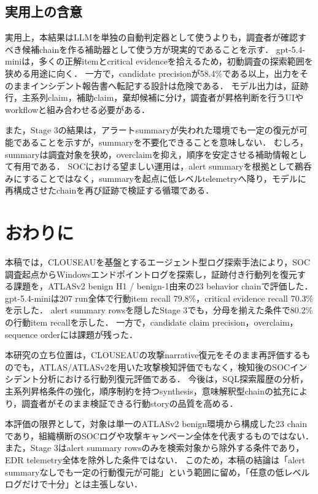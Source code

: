 \documentclass[dvipdfmx]{FITpaper}
\newcommand{\model}[1]{\mbox{\textrm{#1}}}
\begin{document}
\subsection{実用上の含意}

実用上，本結果はLLMを単独の自動判定器として使うよりも，調査者が確認すべき候補chainを作る補助器として使う方が現実的であることを示す．
\model{gpt-5.4-mini}は，多くの正解itemとcritical evidenceを拾えるため，初動調査の探索範囲を狭める用途に向く．
一方で，candidate precisionが58.4\%である以上，出力をそのままインシデント報告書へ転記する設計は危険である．
モデル出力は，証跡行，主系列claim，補助claim，棄却候補に分け，調査者が昇格判断を行うUIやworkflowと組み合わせる必要がある．

また，Stage 3の結果は，アラートsummaryが失われた環境でも一定の復元が可能であることを示すが，summaryを不要化できることを意味しない．
むしろ，summaryは調査対象を狭め，overclaimを抑え，順序を安定させる補助情報として有用である．
SOCにおける望ましい運用は，alert summaryを根拠として鵜呑みにすることではなく，summaryを起点に低レベルtelemetryへ降り，モデルに再構成させたchainを再び証跡で検証する循環である．



\section{おわりに}

本稿では，CLOUSEAUを基盤とするエージェント型ログ探索手法により，SOC調査起点からWindowsエンドポイントログを探索し，証跡付き行動列を復元する課題を，ATLASv2 benign H1 / benign-1由来の23 behavior chainで評価した．
\model{gpt-5.4-mini}は207 run全体で行動item recall 79.8\%，critical evidence recall 70.3\%を示した．
alert summary rowsを隠したStage 3でも，分母を揃えた条件で80.2\%の行動item recallを示した．
一方で，candidate claim precision，overclaim，sequence orderには課題が残った．

本研究の立ち位置は，CLOUSEAUの攻撃narrative復元をそのまま再評価するものでも，ATLAS/ATLASv2を用いた攻撃検知評価でもなく，検知後のSOCインシデント分析における行動列復元評価である．
今後は，SQL探索履歴の分析，主系列昇格条件の強化，順序制約を持つsynthesis，意味解釈型chainの拡充により，調査者がそのまま検証できる行動storyの品質を高める．

本評価の限界として，対象は単一のATLASv2 benign環境から構成した23 chainであり，組織横断のSOCログや攻撃キャンペーン全体を代表するものではない．
また，Stage 3はalert summary rowsのみを検索対象から除外する条件であり，EDR telemetry全体を除外した条件ではない．
このため，本稿の結論は「alert summaryなしでも一定の行動復元が可能」という範囲に留め，「任意の低レベルログだけで十分」とは主張しない．
\end{document}
